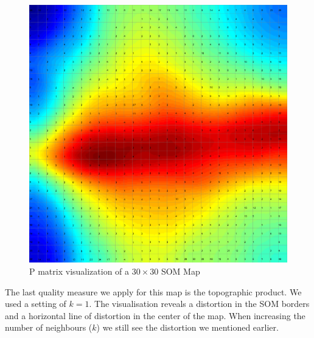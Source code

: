 \documentclass{acm_proc_article-sp}
\begin{document}
\begin{figure}
\centering
\includegraphics[width=\linewidth]{img/wine-big-p-matrix}
\caption{P matrix visualization of a $30\times30$ SOM Map}
\label{fig:wine-big-p-matrix}
\end{figure}

The last quality measure we apply for this map is the topographic product.
We used a setting of $k=1$. The visualisation reveals a distortion in the
SOM borders and a horizontal line of distortion in the center of the map.
When increasing the number of neighbours ($k$) we still see the distortion
we mentioned earlier.
\end{document}
